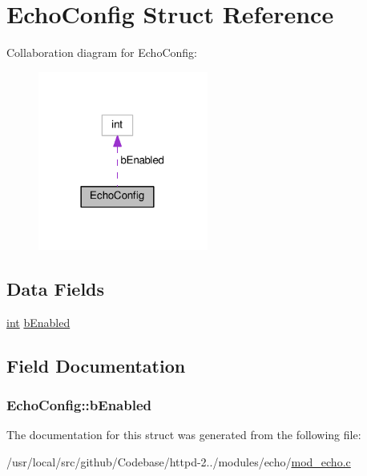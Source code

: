 \hypertarget{structEchoConfig}{}\section{Echo\+Config Struct Reference}
\label{structEchoConfig}


Collaboration diagram for Echo\+Config\+:
\nopagebreak
\begin{figure}[H]
\begin{center}
\leavevmode
\includegraphics[width=158pt]{structEchoConfig__coll__graph}
\end{center}
\end{figure}
\subsection*{Data Fields}
\begin{DoxyCompactItemize}
\item 
\hyperlink{pcre_8txt_a42dfa4ff673c82d8efe7144098fbc198}{int} \hyperlink{structEchoConfig_afc2d71fd85d1de54e42108e3ab62035d}{b\+Enabled}
\end{DoxyCompactItemize}


\subsection{Field Documentation}
\subsubsection[{\texorpdfstring{b\+Enabled}{bEnabled}}]{ Echo\+Config\+::b\+Enabled}\hypertarget{structEchoConfig_afc2d71fd85d1de54e42108e3ab62035d}{}\label{structEchoConfig_afc2d71fd85d1de54e42108e3ab62035d}


The documentation for this struct was generated from the following file\+:\begin{DoxyCompactItemize}
\item 
/usr/local/src/github/\+Codebase/httpd-\/2../modules/echo/\hyperlink{mod__echo_8c}{mod\+\_\+echo.\+c}\end{DoxyCompactItemize}
